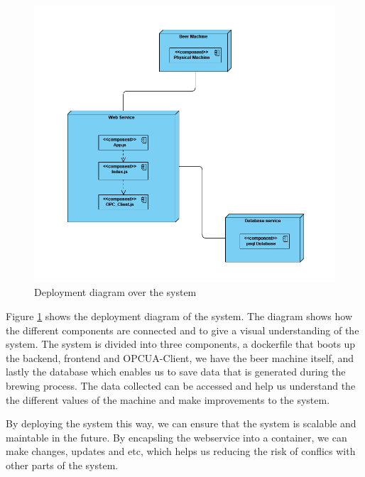 \begin{center}
    \centering
    \begin{figure}[H]
        \includegraphics[width=1\textwidth]{img/Deployment_diagram.png}
        \caption{Deployment diagram over the system}
        \label{fig:Deployment_diagram}
    \end{figure}
\end{center}
Figure \ref{fig:Deployment_diagram} shows the deployment diagram of the system. The diagram shows how the different components are connected and to give a visual understanding of the system. The system is divided into three components, a dockerfile that boots up the backend, frontend and OPCUA-Client, we have the beer machine itself, and lastly the database which enables us to save data that is generated during the brewing process. The data collected can be accessed and help us understand the the different values of the machine and make improvements to the system. \newline

By deploying the system this way, we can ensure that the system is scalable and maintable in the future. By encapsling the webservice into a container, we can make changes, updates and etc, which helps us reducing the risk of conflics with other parts of the system. \newline


